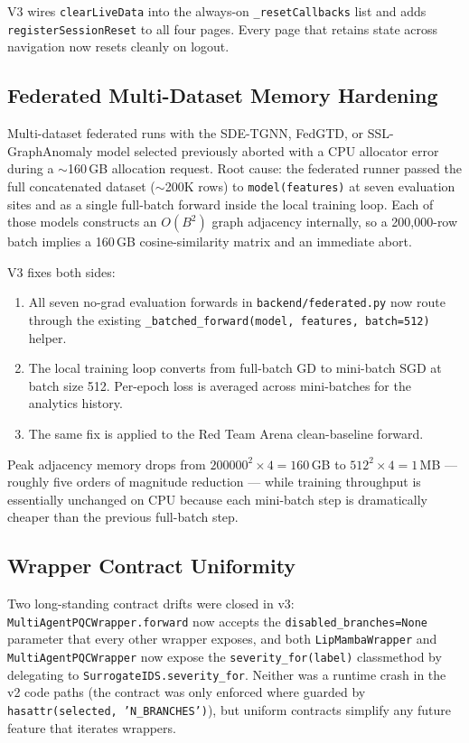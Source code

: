\documentclass[11pt,a4paper]{article}
\begin{document}
V3 wires \texttt{clearLiveData} into the always-on
\texttt{\_resetCallbacks} list and adds \texttt{registerSessionReset}
to all four pages.  Every page that retains state across navigation
now resets cleanly on logout.

\subsection{Federated Multi-Dataset Memory Hardening}
\label{sec:reliability:federated}

Multi-dataset federated runs with the SDE-TGNN, FedGTD, or
SSL-GraphAnomaly model selected previously aborted with a CPU
allocator error during a $\sim$160\,GB allocation request.  Root
cause: the federated runner passed the full concatenated dataset
($\sim$200K rows) to \texttt{model(features)} at seven evaluation
sites and as a single full-batch forward inside the local training
loop.  Each of those models constructs an $O(B^2)$ graph adjacency
internally, so a 200,000-row batch implies a 160\,GB cosine-similarity
matrix and an immediate abort.

V3 fixes both sides:
\begin{enumerate}[nosep]
  \item All seven no-grad evaluation forwards in
        \texttt{backend/federated.py} now route through the existing
        \texttt{\_batched\_forward(model, features, batch=512)}
        helper.
  \item The local training loop converts from full-batch GD to
        mini-batch SGD at batch size 512.  Per-epoch loss is averaged
        across mini-batches for the analytics history.
  \item The same fix is applied to the Red Team Arena clean-baseline
        forward.
\end{enumerate}

Peak adjacency memory drops from $200000^2 \times 4 = 160$\,GB to
$512^2 \times 4 = 1$\,MB --- roughly five orders of magnitude
reduction --- while training throughput is essentially unchanged on
CPU because each mini-batch step is dramatically cheaper than the
previous full-batch step.

\subsection{Wrapper Contract Uniformity}
\label{sec:reliability:contracts}

Two long-standing contract drifts were closed in v3:
\texttt{MultiAgentPQCWrapper.forward} now accepts the
\texttt{disabled\_branches=None} parameter that every other wrapper
exposes, and both \texttt{LipMambaWrapper} and
\texttt{MultiAgentPQCWrapper} now expose the
\texttt{severity\_for(label)} classmethod by delegating to
\texttt{SurrogateIDS.severity\_for}.  Neither was a runtime crash in
the v2 code paths (the contract was only enforced where guarded by
\texttt{hasattr(selected, 'N\_BRANCHES')}), but uniform contracts
simplify any future feature that iterates wrappers.
\end{document}
